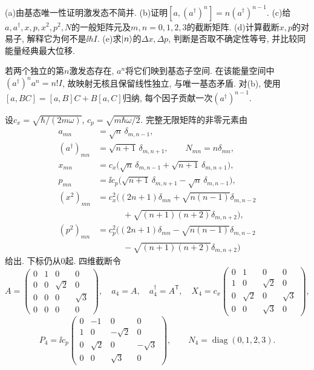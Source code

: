 \begin{exercise}
(a)由基态唯一性证明激发态不简并. (b)证明$[a,(a^\dagger)^n]=n(a^\dagger)^{n-1}$. (c)给$a,a^\dagger,x,p,x^2,p^2,N$的一般矩阵元及$m,n=0,1,2,3$的截断矩阵. (d)计算截断$x,p$的对易子, 解释它为何不是$\ii\hbar I$. (e)求$\lvert n\rangle$的$\Delta x,\Delta p$, 判断是否取不确定性等号, 并比较同能量经典最大位移.
\end{exercise}
\begin{solution}
若两个独立的第$n$激发态存在, $a^n$将它们映到基态子空间. 在该能量空间中$(a^\dagger)^na^n=n!I$, 故映射无核且保留线性独立, 与唯一基态矛盾. 对(b), 使用$[a,BC]=[a,B]C+B[a,C]$归纳, 每个因子贡献一次$(a^\dagger)^{n-1}$.

设$c_x=\sqrt{\hbar/(2m\omega)}$, $c_p=\sqrt{m\hbar\omega/2}$. 完整无限矩阵的非零元素由
\[
\begin{aligned}
a_{mn}&=\sqrt n\,\delta_{m,n-1},\\
(a^\dagger)_{mn}&=\sqrt{n+1}\,\delta_{m,n+1},\qquad N_{mn}=n\delta_{mn},\\
x_{mn}&=c_x\bigl(\sqrt n\,\delta_{m,n-1}+\sqrt{n+1}\,\delta_{m,n+1}\bigr),\\
p_{mn}&=\ii c_p\bigl(\sqrt{n+1}\,\delta_{m,n+1}-\sqrt n\,\delta_{m,n-1}\bigr),\\
(x^2)_{mn}&=c_x^2\bigl((2n+1)\delta_{mn}+\sqrt{n(n-1)}\delta_{m,n-2}\\
&\hspace{3em}+\sqrt{(n+1)(n+2)}\delta_{m,n+2}\bigr),\\
(p^2)_{mn}&=c_p^2\bigl((2n+1)\delta_{mn}-\sqrt{n(n-1)}\delta_{m,n-2}\\
&\hspace{3em}-\sqrt{(n+1)(n+2)}\delta_{m,n+2}\bigr)
\end{aligned}
\]
给出. 下标仍从0起. 四维截断令
\[
A=\begin{pmatrix}0&1&0&0\\0&0&\sqrt2&0\\0&0&0&\sqrt3\\0&0&0&0\end{pmatrix},
\quad a_4=A,\quad a^\dagger_4=A^{\mathsf T},\quad
X_4=c_x\begin{pmatrix}0&1&0&0\\1&0&\sqrt2&0\\0&\sqrt2&0&\sqrt3\\0&0&\sqrt3&0\end{pmatrix},
\]
\[
P_4=\ii c_p\begin{pmatrix}0&-1&0&0\\1&0&-\sqrt2&0\\0&\sqrt2&0&-\sqrt3\\0&0&\sqrt3&0\end{pmatrix},\qquad N_4=\operatorname{diag}(0,1,2,3).
\]
\end{solution}
